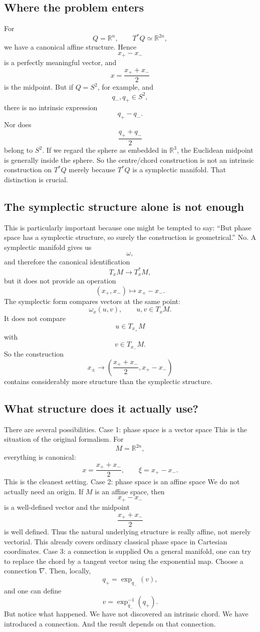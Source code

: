 \subsection{Where the problem enters}
For
$$ Q=\mathbb R^n, \qquad T^*Q\simeq\mathbb R^{2n}, $$
we have a canonical affine structure. Hence
$$ x_+-x_- $$
is a perfectly meaningful vector, and
$$ x=\frac{x_++x_-}{2} $$
is the midpoint.
But if \(Q=S^2\), for example, and
$$ q_-,q_+\in S^2, $$
there is no intrinsic expression
$$ q_+-q_-. $$
Nor does
$$ \frac{q_++q_-}{2} $$
belong to \(S^2\). If we regard the sphere as embedded in \(\mathbb R^3\), the
Euclidean midpoint is generally inside the sphere.
So the centre/chord construction is not an intrinsic construction on \(T^*Q\)
merely because \(T^*Q\) is a symplectic manifold.
That distinction is crucial.

\subsection{ The symplectic structure alone is not enough}
This is particularly important because one might be tempted to say:
“But phase space has a symplectic structure, so surely the construction is geometrical.”
No.
A symplectic manifold gives us
$$ \omega, $$
and therefore the canonical identification
$$ T_xM\longrightarrow T_x^*M, $$
but it does not provide an operation
$$ (x_+,x_-)\mapsto x_+-x_-. $$
The symplectic form compares vectors at the same point:
$$ \omega_x(u,v), \qquad u,v\in T_xM. $$
It does not compare
$$ u\in T_{x_+}M $$
with
$$ v\in T_{x_-}M. $$
So the construction
$$ x_\pm\longrightarrow \left( \frac{x_++x_-}{2}, x_+-x_- \right) $$
contains considerably more structure than the symplectic structure.

\subsection{ What structure does it actually use?}
There are several possibilities.
Case 1: phase space is a vector space
This is the situation of the original formalism.
For
$$ M=\mathbb R^{2n}, $$
everything is canonical:
$$ x=\frac{x_++x_-}{2}, \qquad \xi=x_+-x_-. $$
This is the cleanest setting.
Case 2: phase space is an affine space
We do not actually need an origin.
If \(M\) is an affine space, then
$$ x_+-x_- $$
is a well-defined vector and the midpoint
$$ \frac{x_++x_-}{2} $$
is well defined.
Thus the natural underlying structure is really affine, not merely vectorial.
This already covers ordinary classical phase space in Cartesian coordinates.
Case 3: a connection is supplied
On a general manifold, one can try to replace the chord by a tangent vector
using the exponential map.
Choose a connection \(\nabla\). Then, locally,
$$ q_+ = \exp_{q_-}(v), $$
and one can define
$$ v=\exp_{q_-}^{-1}(q_+). $$
But notice what happened.
We have not discovered an intrinsic chord.
We have introduced a connection.
And the result depends on that connection.

